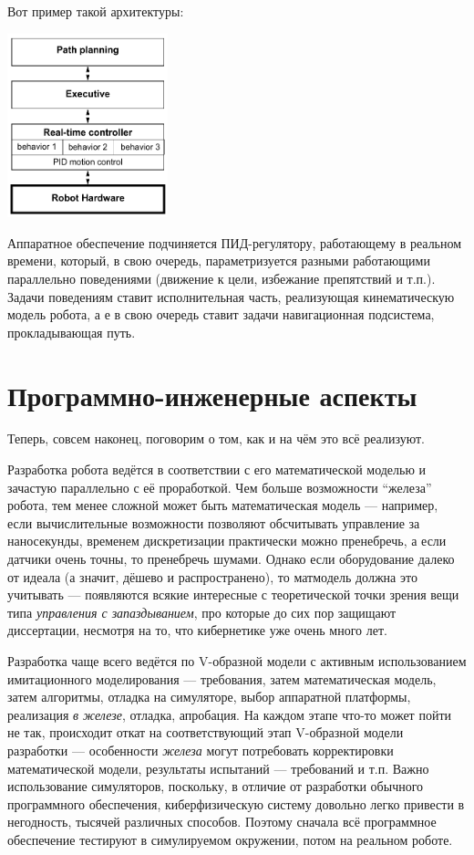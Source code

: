 \documentclass{../../text-style}
\begin{document}
Вот пример такой архитектуры:

\begin{center}
    \includegraphics[width=0.35\textwidth]{navigationTiers.png}
\end{center}

Аппаратное обеспечение подчиняется ПИД-регулятору, работающему в реальном времени, который, в свою очередь, параметризуется разными работающими параллельно поведениями (движение к цели, избежание препятствий и т.п.).
Задачи поведениям ставит исполнительная часть, реализующая кинематическую модель робота, а е в свою очередь ставит задачи навигационная подсистема, прокладывающая путь.

\section{Программно-инженерные аспекты}

Теперь, совсем наконец, поговорим о том, как и на чём это всё реализуют.

Разработка робота ведётся в соответствии с его математической моделью и зачастую параллельно с её проработкой.
Чем больше возможности \enquote{железа} робота, тем менее сложной может быть математическая модель --- например, если вычислительные возможности позволяют обсчитывать управление за наносекунды, временем дискретизации практически можно пренебречь, а если датчики очень точны, то пренебречь шумами.
Однако если оборудование далеко от идеала (а значит, дёшево и распространено), то матмодель должна это учитывать --- появляются всякие интересные с теоретической точки зрения вещи типа \emph{управления с запаздыванием}, про которые до сих пор защищают диссертации, несмотря на то, что кибернетике уже очень много лет.

Разработка чаще всего ведётся по V-образной модели с активным использованием имитационного моделирования --- требования, затем математическая модель, затем алгоритмы, отладка на симуляторе, выбор аппаратной платформы, реализация \emph{в железе}, отладка, апробация.
На каждом этапе что-то может пойти не так, происходит откат на соответствующий этап V-образной модели разработки --- особенности \emph{железа} могут потребовать корректировки математической модели, результаты испытаний --- требований и т.п.
Важно использование симуляторов, поскольку, в отличие от разработки обычного программного обеспечения, киберфизическую систему довольно легко привести в негодность, тысячей различных способов.
Поэтому сначала всё программное обеспечение тестируют в симулируемом окружении, потом на реальном роботе.
\end{document}
